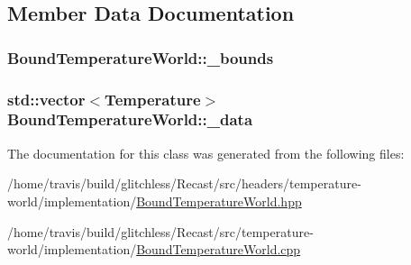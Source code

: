 \subsection{Member Data Documentation}
\hypertarget{class_bound_temperature_world_a4e460fde774b68cb821e6b263e71448b}{
\subsubsection[{\-\_\-bounds}]{ Bound\-Temperature\-World\-::\-\_\-bounds\hspace{0.3cm}{\ttfamily [protected]}}}\label{class_bound_temperature_world_a4e460fde774b68cb821e6b263e71448b}
\hypertarget{class_bound_temperature_world_a7c0722e68bbe02de068ccb6244522c7a}{
\subsubsection[{\-\_\-data}]{\setlength{\rightskip}{0pt plus 5cm}std\-::vector$<${\bf Temperature}$>$ Bound\-Temperature\-World\-::\-\_\-data\hspace{0.3cm}{\ttfamily [protected]}}}\label{class_bound_temperature_world_a7c0722e68bbe02de068ccb6244522c7a}


The documentation for this class was generated from the following files\-:\begin{DoxyCompactItemize}
\item 
/home/travis/build/glitchless/\-Recast/src/headers/temperature-\/world/implementation/\hyperlink{_bound_temperature_world_8hpp}{Bound\-Temperature\-World.\-hpp}\item 
/home/travis/build/glitchless/\-Recast/src/temperature-\/world/implementation/\hyperlink{_bound_temperature_world_8cpp}{Bound\-Temperature\-World.\-cpp}\end{DoxyCompactItemize}
